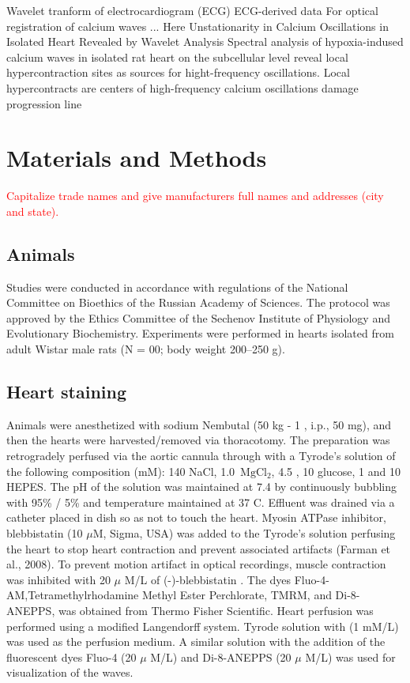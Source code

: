 \documentclass{biophys-new}
\begin{document}
Wavelet tranform of electrocardiogram (ECG) ECG-derived data \cite{sharma2017use}
For optical registration of calcium waves \cite{matsuura2018intravital} ...
Here
Unstationarity in Calcium Oscillations in Isolated Heart Revealed by Wavelet Analysis
Spectral analysis of hypoxia-indused calcium waves in isolated rat heart on the subcellular level reveal local hypercontraction sites as sources for hight-frequency oscillations.
Local hypercontracts are centers of high-frequency calcium oscillations
damage progression line

\section*{Materials and Methods}

\textcolor{red}{Capitalize trade names and give manufacturers full names and addresses (city and state).}

\subsection*{Animals}

Studies were conducted in accordance with regulations of the National Committee on Bioethics of the Russian Academy of Sciences.
The protocol was approved by the Ethics Committee of the Sechenov Institute of Physiology and Evolutionary Biochemistry.
Experiments were performed in hearts isolated from adult Wistar male rats (N = 00; body weight 200–250 g).

\subsection*{Heart staining}

Animals were anesthetized with sodium Nembutal (50 kg - 1 , i.p., 50 mg), and then the hearts were harvested/removed via thoracotomy.
The preparation was retrogradely perfused via the aortic cannula through with a Tyrode’s solution of the following composition (mM): 140 NaCl, 1.0 \(\,\mathrm{Mg}\mathrm{Cl}_2\), 4.5 , 10 glucose, 1  and 10 HEPES.
The pH of the solution was maintained at 7.4 by continuously bubbling with 95\% / 5\%  and temperature maintained at 37 C\degree.
Effluent was drained via a catheter placed in dish so as not to touch the heart.
Myosin ATPase inhibitor, blebbistatin (10 $\mu$M, Sigma, USA) was added to the Tyrode’s solution perfusing the heart to stop heart contraction and prevent associated artifacts (Farman et al., 2008).
To prevent motion artifact in optical recordings, muscle contraction was inhibited with 20 $\mu$ M/L of (-)-blebbistatin \cite{kong2014role}.
The dyes Fluo-4-AM,Tetramethylrhodamine Methyl Ester Perchlorate, TMRM, and Di-8-ANEPPS, was obtained from Thermo Fisher Scientific.
Heart perfusion was performed using a modified Langendorff system. Tyrode solution with  (1 mM/L) was used as the perfusion medium.
A similar solution with the addition of the fluorescent dyes Fluo-4 (20 $\mu$ M/L) and Di-8-ANEPPS (20 $\mu$ M/L) was used for visualization of the  waves.
\end{document}
